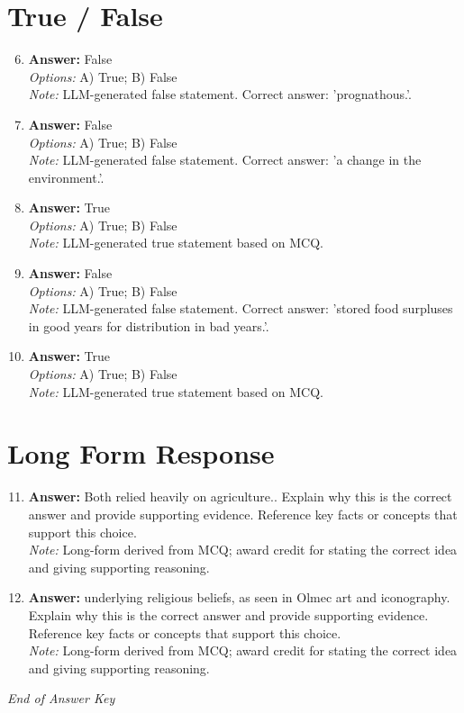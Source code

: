 \documentclass[12pt]{article}
\begin{document}
\section*{True / False}
\begin{enumerate}[label=\arabic*.]
\setcounter{enumi}{5}
\item \textbf{Answer:} False
\\ \textit{Options:} A) True; B) False
\\ \textit{Note:} LLM-generated false statement. Correct answer: 'prognathous.'.
\item \textbf{Answer:} False
\\ \textit{Options:} A) True; B) False
\\ \textit{Note:} LLM-generated false statement. Correct answer: 'a change in the environment.'.
\item \textbf{Answer:} True
\\ \textit{Options:} A) True; B) False
\\ \textit{Note:} LLM-generated true statement based on MCQ.
\item \textbf{Answer:} False
\\ \textit{Options:} A) True; B) False
\\ \textit{Note:} LLM-generated false statement. Correct answer: 'stored food surpluses in good years for distribution in bad years.'.
\item \textbf{Answer:} True
\\ \textit{Options:} A) True; B) False
\\ \textit{Note:} LLM-generated true statement based on MCQ.
\end{enumerate}

\section*{Long Form Response}
\begin{enumerate}[label=\arabic*.]
\setcounter{enumi}{10}
\item \textbf{Answer:} Both relied heavily on agriculture.. Explain why this is the correct answer and provide supporting evidence. Reference key facts or concepts that support this choice.
\\ \textit{Note:} Long-form derived from MCQ; award credit for stating the correct idea and giving supporting reasoning.
\item \textbf{Answer:} underlying religious beliefs, as seen in Olmec art and iconography. Explain why this is the correct answer and provide supporting evidence. Reference key facts or concepts that support this choice.
\\ \textit{Note:} Long-form derived from MCQ; award credit for stating the correct idea and giving supporting reasoning.
\end{enumerate}

\vfill
\noindent\textit{End of Answer Key}
\end{document}

